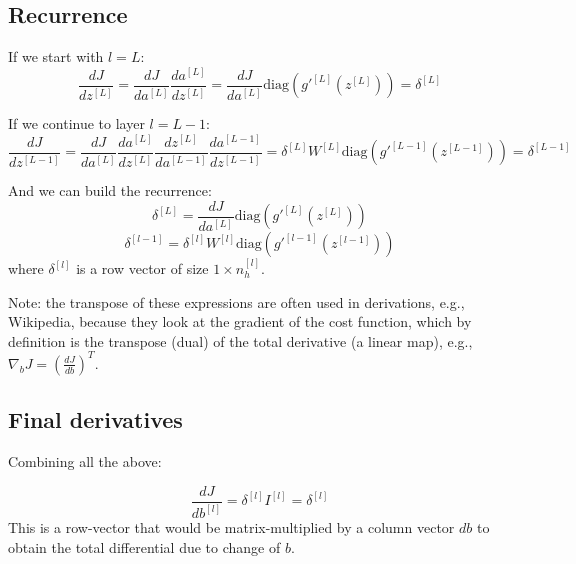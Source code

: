 \documentclass[letterpaper,12pt,oneside]{article}
\begin{document}
\subsection{Recurrence}

If we start with $l=L$:
\begin{equation}
\frac{dJ}{dz^{[L]}} =  \frac{dJ}{da^{[L]}} \frac{da^{[L]}}{dz^{[L]}} = \frac{dJ}{da^{[L]}} \mathrm{diag} \left( g'^{[L]} (z^{[L]}) \right) = \delta^{[L]}
\end{equation}

If we continue to layer $l=L-1$:
\begin{equation}
\frac{dJ}{dz^{[L-1]}} = \frac{dJ}{da^{[L]}} \frac{da^{[L]}}{dz^{[L]}} \frac{dz^{[L]}}{da^{[L-1]}} \frac{da^{[L-1]}}{dz^{[L-1]}} = \delta^{[L]} W^{[L]} \mathrm{diag} \left( g'^{[L-1]} (z^{[L-1]}) \right) = \delta^{[L-1]}
\end{equation}

And we can build the recurrence:
\begin{equation}
\delta^{[L]} = \frac{dJ}{da^{[L]}} \mathrm{diag} \left( g'^{[L]} (z^{[L]}) \right)
\end{equation}
\begin{equation}
\delta^{[l-1]} = \delta^{[l]} W^{[l]} \mathrm{diag} \left( g'^{[l-1]} (z^{[l-1]})\right)
\end{equation}
where $\delta^{[l]}$ is a row vector of size $1 \times n_h^{[l]}$.

Note: the transpose of these expressions are often used in derivations, e.g., Wikipedia, because they look at the gradient of the cost function, which by definition is the transpose (dual) of the total derivative (a linear map), e.g., $\nabla_b J = \left( \frac{dJ}{db} \right)^T$.

\subsection{Final derivatives}

Combining all the above:

\begin{equation}
\frac{dJ}{db^{[l]}} = \delta^{[l]}  I^{[l]} = \delta^{[l]}
\end{equation}
This is a row-vector that would be matrix-multiplied by a column vector $db$ to obtain the total differential due to change of $b$.
\end{document}
